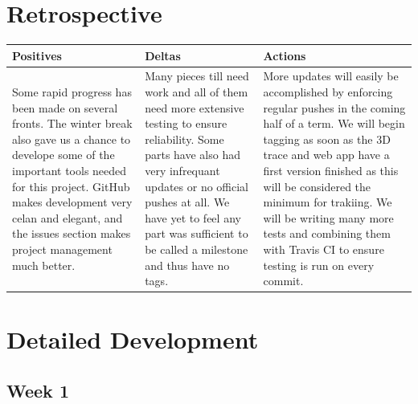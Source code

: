 \documentclass[onecolumn, draftclsnofoot,10pt, compsoc]{IEEEtran}
\begin{document}
\section {Retrospective}
\begin {center}
 \begin {tabular} { | p{5cm} | p{5cm} | p{5cm} | }
 \hline
 Positives & Deltas & Actions \\
 \hline
 Some rapid progress has been made on several fronts. The winter break also gave us a chance to develope some of the important tools needed for this project. GitHub makes development very celan and elegant, and the issues section makes project management much better. & Many pieces till need work and all of them need more extensive testing to ensure reliability. Some parts have also had very infrequant updates or no official pushes at all. We have yet to feel any part was sufficient to be called a milestone and thus have no tags. & More updates will easily be accomplished by enforcing regular pushes in the coming half of a term. We will begin tagging as soon as the 3D trace and web app have a first version finished as this will be considered the minimum for trakiing. We will be writing many more tests and combining them with Travis CI to ensure testing is run on every commit.\\
 \hline
 \end {tabular}
\end {center} 
\section {Detailed Development}
\subsection {Week 1}
\end{document}
